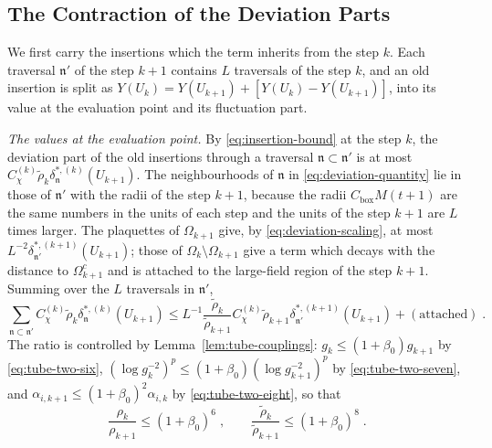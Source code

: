 \documentclass[11pt]{preprint}
\numberwithin{equation}{section}
\theoremstyle{definition}
\theoremstyle{remark}
\theoremstyle{plain}
\begin{document}
\subsection{The Contraction of the Deviation Parts}\label{sec:contraction}

We first carry the insertions which the term inherits from the step $k$. Each traversal $\mathfrak n'$ of the step $k + 1$ contains $L$ traversals of the step $k$, and an old insertion is split as $Y(U_k) = Y(U_{k+1}) + [Y(U_k) - Y(U_{k+1})]$, into its value at the evaluation point and its fluctuation part.

\emph{The values at the evaluation point.} By \eqref{eq:insertion-bound} at the step $k$, the deviation part of the old insertions through a traversal $\mathfrak n \subset \mathfrak n'$ is at most $C^{(k)}_\chi\tilde\rho_k\delta^{*,(k)}_{\mathfrak n}(U_{k+1})$. The neighbourhoods of $\mathfrak n$ in \eqref{eq:deviation-quantity} lie in those of $\mathfrak n'$ with the radii of the step $k + 1$, because the radii $C_{\mathrm{box}}M(t + 1)$ are the same numbers in the units of each step and the units of the step $k + 1$ are $L$ times larger. The plaquettes of $\Omega_{k+1}$ give, by \eqref{eq:deviation-scaling}, at most $L^{-2}\delta^{*,(k+1)}_{\mathfrak n'}(U_{k+1})$; those of $\Omega_k \setminus \Omega_{k+1}$ give a term which decays with the distance to $\Omega_{k+1}^c$ and is attached to the large-field region of the step $k + 1$. Summing over the $L$ traversals in $\mathfrak n'$,
\begin{equation}\label{eq:contraction-first}
    \sum_{\mathfrak n \subset \mathfrak n'}C^{(k)}_\chi\tilde\rho_k\delta^{*,(k)}_{\mathfrak n}(U_{k+1}) \leq L^{-1}\frac{\tilde\rho_k}{\tilde\rho_{k+1}}C^{(k)}_\chi\tilde\rho_{k+1}\delta^{*,(k+1)}_{\mathfrak n'}(U_{k+1}) + (\text{attached})\;.
\end{equation}
The ratio is controlled by Lemma~\ref{lem:tube-couplings}: $g_k \leq (1 + \beta_0)g_{k+1}$ by \eqref{eq:tube-two-six}, $(\log g_k^{-2})^p \leq (1 + \beta_0)(\log g_{k+1}^{-2})^p$ by \eqref{eq:tube-two-seven}, and $\alpha_{i,k+1} \leq (1 + \beta_0)^2\alpha_{i,k}$ by \eqref{eq:tube-two-eight}, so that
\begin{equation}\label{eq:rho-ratio}
    \frac{\rho_k}{\rho_{k+1}} \leq (1 + \beta_0)^6\;,
    \qquad
    \frac{\tilde\rho_k}{\tilde\rho_{k+1}} \leq (1 + \beta_0)^8\;.
\end{equation}
\end{document}
